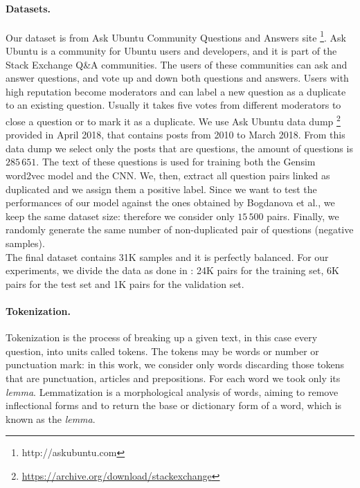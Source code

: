 \documentclass[10pt,twocolumn,letterpaper]{article}
\begin{document}
\paragraph{Datasets.}
Our dataset is from Ask Ubuntu Community Questions and Answers site \footnote{http://askubuntu.com}. Ask Ubuntu is a community for Ubuntu users and developers, and it is part of the Stack Exchange Q\&A communities. The users of these communities can ask and answer questions, and vote up and down both questions and answers. Users with high reputation become moderators and can label a new question as a duplicate to an existing question. Usually it takes five votes from different moderators to close a question or to mark it as a duplicate. 
We use Ask Ubuntu data dump \footnote{ \url{https://archive.org/download/stackexchange}} provided in April 2018, that contains posts from 2010 to March 2018. From this data dump we select only the posts that are questions, the amount of questions is $285\,651$. The text of these questions is used for training both the Gensim word2vec model and the CNN. We, then, extract all question pairs linked as duplicated and we assign them a positive label. Since we want to test the performances of our model against the ones obtained by Bogdanova et al., we keep the same dataset size: therefore we consider only $15\,500$ pairs. Finally, we randomly generate the same number of non-duplicated pair of questions (negative samples). \\
The final dataset contains 31K samples and it is perfectly balanced. For our experiments, we divide the data as done in \cite{bogdanova2015detecting}: 24K pairs for the training set, 6K pairs for the test set and 1K pairs for the validation set.

\paragraph{Tokenization.}
Tokenization is the process of breaking up a given text, in this case every question, into units called tokens. The tokens may be words or number or punctuation mark: in this work, we consider only words discarding those tokens that are punctuation, articles and prepositions.
For each word we took only its \emph{lemma}. Lemmatization is a morphological analysis of words, aiming to remove inflectional forms and to return the base or dictionary form of a word, which is known as the \emph{lemma}.
\end{document}
